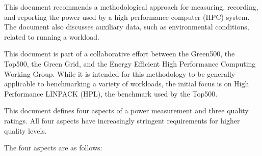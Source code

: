 \noindent
This document recommends a methodological approach for measuring, recording, and reporting the power used by a high performance 
computer (HPC) system. The document also discusses auxiliary data, such as environmental conditions, related to 
running a workload. 
\wl

\noindent
This document is part of a collaborative effort between the Green500, the Top500, 
the Green Grid, and the Energy Efficient High Performance Computing Working Group.  While 
it is intended for this methodology to be generally applicable to benchmarking a variety of 
workloads, the initial focus is on High Performance LINPACK (HPL), the benchmark used by the Top500. 
\wl

\noindent
This document defines four aspects of a power measurement and three quality ratings. All 
four aspects have increasingly stringent requirements for higher quality levels.  
\wl

\noindent
The four aspects are as follows:
\wl

